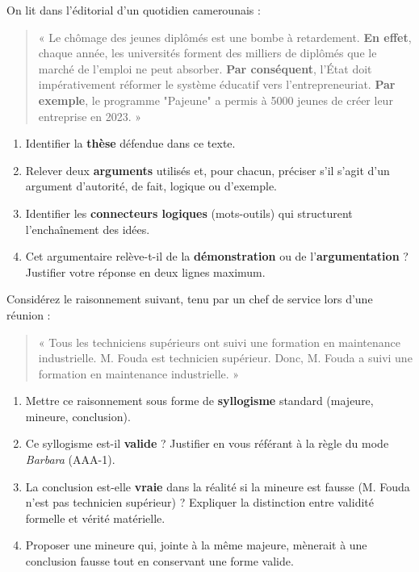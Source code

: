 \documentclass[11pt]{article}
\begin{document}
\begin{exercice}
On lit dans l'éditorial d'un quotidien camerounais : 
\begin{quote}
« Le chômage des jeunes diplômés est une bombe à retardement. \textbf{En effet}, chaque année, les universités forment des milliers de diplômés que le marché de l'emploi ne peut absorber. \textbf{Par conséquent}, l'État doit impérativement réformer le système éducatif vers l'entrepreneuriat. \textbf{Par exemple}, le programme "Pajeune" a permis à 5000 jeunes de créer leur entreprise en 2023. »
\end{quote}
\begin{enumerate}
    \item Identifier la \textbf{thèse} défendue dans ce texte.
    \item Relever deux \textbf{arguments} utilisés et, pour chacun, préciser s'il s'agit d'un argument d'autorité, de fait, logique ou d'exemple.
    \item Identifier les \textbf{connecteurs logiques} (mots-outils) qui structurent l'enchaînement des idées.
    \item Cet argumentaire relève-t-il de la \textbf{démonstration} ou de l'\textbf{argumentation} ? Justifier votre réponse en deux lignes maximum.
\end{enumerate}
\end{exercice}

\begin{exercice}
Considérez le raisonnement suivant, tenu par un chef de service lors d'une réunion : 
\begin{quote}
« Tous les techniciens supérieurs ont suivi une formation en maintenance industrielle. M. Fouda est technicien supérieur. Donc, M. Fouda a suivi une formation en maintenance industrielle. »
\end{quote}
\begin{enumerate}
    \item Mettre ce raisonnement sous forme de \textbf{syllogisme} standard (majeure, mineure, conclusion).
    \item Ce syllogisme est-il \textbf{valide} ? Justifier en vous référant à la règle du mode \textit{Barbara} (AAA-1).
    \item La conclusion est-elle \textbf{vraie} dans la réalité si la mineure est fausse (M. Fouda n'est pas technicien supérieur) ? Expliquer la distinction entre validité formelle et vérité matérielle.
    \item Proposer une mineure qui, jointe à la même majeure, mènerait à une conclusion fausse tout en conservant une forme valide.
\end{enumerate}
\end{exercice}
\end{document}
